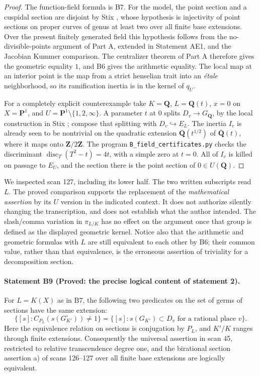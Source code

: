 \begin{proof}
The function-field formula is B7. For the model, the point section and a
cuspidal section are disjoint by Stix
\cite[Theorem 14(2)]{B_Stix2008}, whose hypothesis is injectivity of point
sections on proper curves of genus at least two over all finite base
extensions. Over the present finitely generated field this hypothesis follows from the
no-divisible-points argument of Part A, extended in Statement AE1, and the Jacobian Kummer
comparison. The centralizer theorem of Part A therefore gives the
geometric equality $1$, and B6 gives the arithmetic equality.
The local map at an interior point is the map from a strict henselian
trait into an \emph{\'etale} neighborhood, so its ramification inertia is
in the kernel of $q_U$.

For a completely explicit counterexample take $K=\mathbf Q$,
$L=\mathbf Q(t)$, $x=0$ on $X=\mathbf P^1$, and
$U=\mathbf P^1\setminus\{1,2,\infty\}$. A parameter $t$ at $0$ splits
$D_v\to G_{\mathbf Q}$, by the local construction in Stix
\cite[Proposition 8]{B_Stix2008}; compose that splitting with
$D_v\hookrightarrow E_L$. The inertia $I_v$ is already seen to be
nontrivial on the quadratic extension $\overline{\mathbf Q}(t^{1/2})$
of $\overline{\mathbf Q}(t)$, where it maps onto $\mathbf Z/2\mathbf Z$.
The program \texttt{B\_field\_certificates.py} checks the discriminant
$\operatorname{disc}_T(T^2-t)=4t$, with a simple zero at $t=0$.
All of $I_v$ is killed on passage to $E_U$, and the section there is the
point section of $0\in U(\mathbf Q)$.
\end{proof}

We inspected scan 127, including its lower half. The two written
subscripts read $L$. The proved comparison supports the replacement of
the \emph{mathematical assertion} by its $U$ version in the indicated
context. It does not authorize silently changing the transcription, and
does not establish what the author intended. The slash/comma variation
in $\pi_{L/K}$ has no effect on the argument once that group is defined
as the displayed geometric kernel. Notice also that the arithmetic and
geometric formulas with $L$ are still equivalent to each other by B6;
their common value, rather than that equivalence, is the erroneous
assertion of triviality for a decomposition section.

\paragraph{Statement B9 (Proved: the precise logical content of statement 2).}\label{res:B9}
For $L=K(X)$ as in B7, the following two predicates on the set of germs
of sections have the same extension:
\[
 \{[s]:C_{P_L}(s(G_{K'}^\circ))\ne1\}
 =
 \{[s]:s(G_{K'})\subset D_v\text{ for a rational place }v\}.
\]
Here the equivalence relation on sections is conjugation by $P_L$, and
$K'/K$ ranges through finite extensions. Consequently the universal
assertion in scan 45, restricted to relative transcendence degree one,
and the birational section assertion a) of scans 126--127 over all finite
base extensions are logically equivalent.

